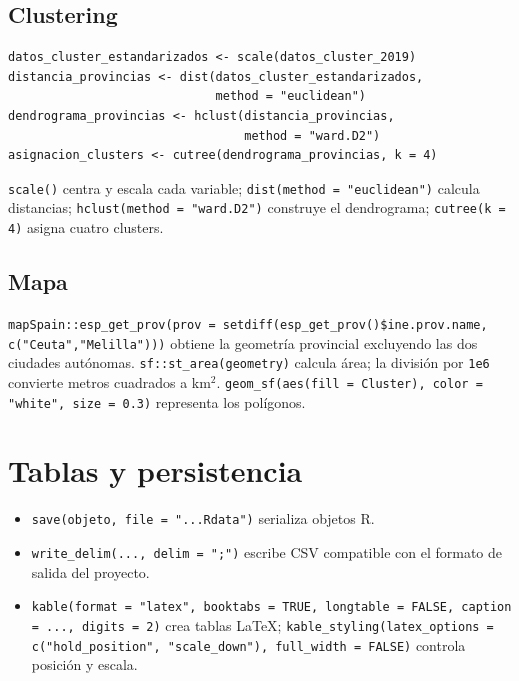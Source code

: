 \documentclass[10pt,a4paper]{article}
\newcommand{\code}[1]{\texttt{\small #1}}
\begin{document}
\subsection{Clustering}
\begin{lstlisting}
datos_cluster_estandarizados <- scale(datos_cluster_2019)
distancia_provincias <- dist(datos_cluster_estandarizados,
                             method = "euclidean")
dendrograma_provincias <- hclust(distancia_provincias,
                                 method = "ward.D2")
asignacion_clusters <- cutree(dendrograma_provincias, k = 4)
\end{lstlisting}
\code{scale()} centra y escala cada variable; \code{dist(method = "euclidean")} calcula distancias; \code{hclust(method = "ward.D2")} construye el dendrograma; \code{cutree(k = 4)} asigna cuatro clusters.

\subsection{Mapa}
\code{mapSpain::esp\_get\_prov(prov = setdiff(esp\_get\_prov()\$ine.prov.name, c("Ceuta","Melilla")))} obtiene la geometría provincial excluyendo las dos ciudades autónomas. \code{sf::st\_area(geometry)} calcula área; la división por \code{1e6} convierte metros cuadrados a km$^2$. \code{geom\_sf(aes(fill = Cluster), color = "white", size = 0.3)} representa los polígonos.

\section{Tablas y persistencia}
\begin{itemize}[leftmargin=1.4em]
\item \code{save(objeto, file = "...Rdata")} serializa objetos R.
\item \code{write\_delim(..., delim = ";")} escribe CSV compatible con el formato de salida del proyecto.
\item \code{kable(format = "latex", booktabs = TRUE, longtable = FALSE, caption = ..., digits = 2)} crea tablas LaTeX; \code{kable\_styling(latex\_options = c("hold\_position", "scale\_down"), full\_width = FALSE)} controla posición y escala.
\end{itemize}
\end{document}
